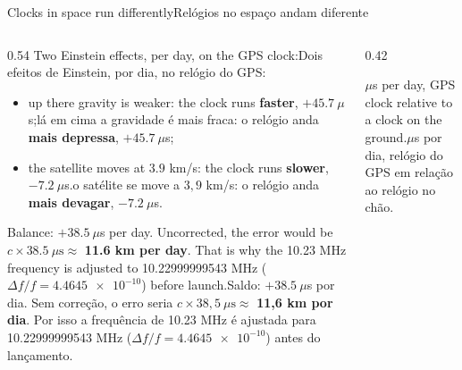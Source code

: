 \documentclass[aspectratio=169,11pt]{beamer}
\newcommand{\tr}[2]{\ifEN#2\else#1\fi}
\newcommand{\bnum}[1]{\textbf{\textcolor{mTeal}{#1}}}
\begin{document}
\begin{frame}{\tr{Relógios no espaço andam diferente}{Clocks in space run differently}}
  \begin{columns}[T]
    \begin{column}{0.54\textwidth}
      \small
      \tr{Dois efeitos de Einstein, por dia, no relógio do GPS:}{Two Einstein effects, per day, on the GPS clock:}
      \begin{itemize}
        \setlength{\itemsep}{3pt}
        \item \tr{lá em cima a gravidade é mais fraca: o relógio anda \bnum{mais depressa}, $+\num{45.7}\ \mu$s;}{up there gravity is weaker: the clock runs \bnum{faster}, $+\num{45.7}\ \mu$s;}
        \item \tr{o satélite se move a $3{,}9$ km/s: o relógio anda \bnum{mais devagar}, $-\num{7.2}\ \mu$s.}{the satellite moves at $3.9$ km/s: the clock runs \bnum{slower}, $-\num{7.2}\ \mu$s.}
      \end{itemize}
      \tr{Saldo: $+\num{38.5}\ \mu$s por dia. Sem correção, o erro seria $c \times 38{,}5\ \mu\text{s} \approx$ \bnum{11,6 km por dia}. Por isso a frequência de \num{10.23} MHz é ajustada para \num{10.22999999543} MHz ($\Delta f/f = \num{4.4645e-10}$) antes do lançamento.}{Balance: $+\num{38.5}\ \mu$s per day. Uncorrected, the error would be $c \times 38.5\ \mu\text{s} \approx$ \bnum{11.6 km per day}. That is why the \num{10.23} MHz frequency is adjusted to \num{10.22999999543} MHz ($\Delta f/f = \num{4.4645e-10}$) before launch.}
    \end{column}
    \begin{column}{0.42\textwidth}
      \centering
      \par\smallskip
      {\scriptsize\textcolor{mStoneMid}{\tr{$\mu$s por dia, relógio do GPS em relação ao relógio no chão.}{$\mu$s per day, GPS clock relative to a clock on the ground.}}}
    \end{column}
  \end{columns}
\end{frame}
\end{document}
